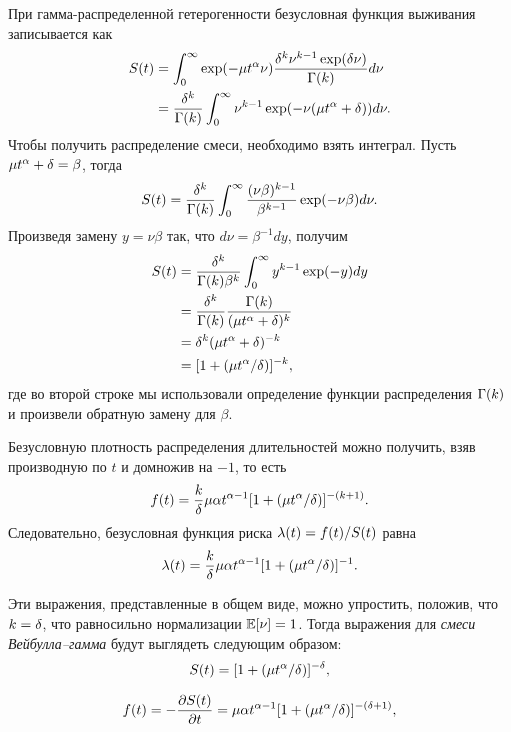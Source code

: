 При гамма-распределенной гетерогенности безусловная функция выживания записывается как
    \begin{align}
        \label{eq:18.8}
        S(t) &= \int^{\infty}_{0}\exp(-\mu t^{\alpha}\nu) \frac{\delta^k\nu^{k-1}\exp(\delta\nu)}{\Gamma(k)} d\nu \\
             &= \frac{\delta^k}{\Gamma(k)} \int^{\infty}_{0}\nu^{k-1}\exp(-\nu(\mu t^{\alpha} + \delta)) d\nu. \notag
    \end{align}
Чтобы получить распределение смеси, необходимо взять интеграл. Пусть $\mu t^{\alpha} + \delta = \beta$, тогда
    $$S(t) = \frac{\delta^k}{\Gamma(k)} \int^{\infty}_{0} \frac{(\nu\beta)^{k-1}}{\beta^{k-1}} \exp(-\nu\beta) d\nu.$$
Произведя замену $y = \nu\beta$ так, что $d\nu = \beta^{-1}dy$, получим
    \begin{align}
        \label{eq:18.9}
        S(t) &= \frac{\delta^k}{\Gamma(k)\beta^k} \int^{\infty}_{0} y^{k-1} \exp(-y) dy \notag\\
             &= \frac{\delta^k}{\Gamma(k)} \frac{\Gamma(k)}{(\mu t^\alpha + \delta)^k} \notag \\
             &= \delta^k(\mu t^\alpha + \delta)^{-k} \notag \\
             &= [1 + (\mu t^\alpha / \delta)]^{-k},
    \end{align}
где во второй строке мы использовали определение функции распределения $\Gamma(k)$ и произвели обратную замену для $\beta$.

Безусловную плотность распределения длительностей можно получить, взяв производную по $t$ и домножив на $-1$, то есть
    \begin{align}
        \label{eq:18.10}
        f(t) = \frac{k}{\delta} \mu \alpha t^{\alpha-1} [1 + (\mu t^\alpha /\delta)]^{-(k+1)}.
    \end{align}
Следовательно, безусловная функция риска $\lambda(t) = f(t) / S(t)$ равна
    \begin{align}
        \label{eq:18.11}
        \lambda(t) = \frac{k}{\delta} \mu \alpha t^{\alpha-1} [1 + (\mu t^\alpha /\delta)]^{-1}.
    \end{align}

Эти выражения, представленные в общем виде, можно упростить, положив, что $k = \delta$, что равносильно нормализации $\mathbb{E}[\nu] = 1$. Тогда выражения для \textit{смеси Вейбулла--гамма} будут выглядеть следующим образом:
    \begin{align}
        \label{eq:18.12}
        S(t) = [1 + (\mu t^\alpha / \delta)]^{-\delta},
    \end{align}

    \begin{align}
        \label{eq:18.13}
        f(t) = -\frac{\partial S(t)}{\partial t} = \mu \alpha t^{\alpha-1}[1 + (\mu t^{\alpha} / \delta)]^{-(\delta + 1)},
    \end{align}

